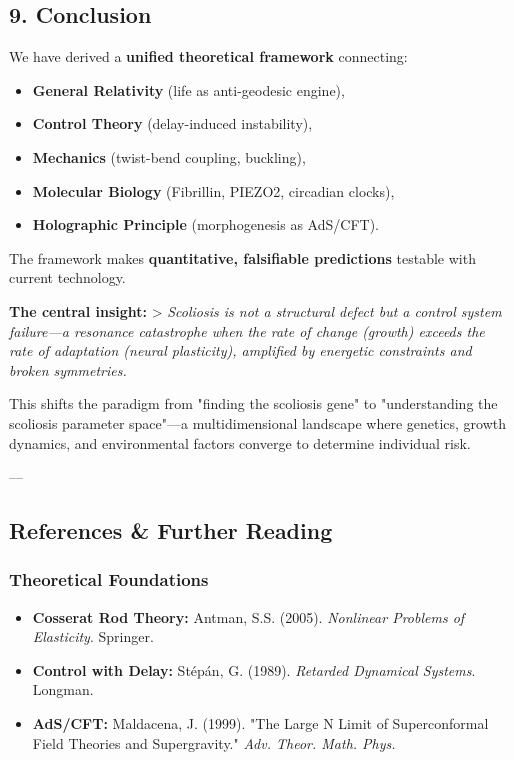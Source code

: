 \documentclass[11pt,a4paper]{article}
\begin{document}
\subsection{9. Conclusion}

We have derived a \textbf{unified theoretical framework} connecting:

\begin{itemize}
\item \textbf{General Relativity} (life as anti-geodesic engine),
\item \textbf{Control Theory} (delay-induced instability),
\item \textbf{Mechanics} (twist-bend coupling, buckling),
\item \textbf{Molecular Biology} (Fibrillin, PIEZO2, circadian clocks),
\item \textbf{Holographic Principle} (morphogenesis as AdS/CFT).
\end{itemize}

The framework makes \textbf{quantitative, falsifiable predictions} testable with current technology.

\textbf{The central insight:}
> \textit{Scoliosis is not a structural defect but a control system failure—a resonance catastrophe when the rate of change (growth) exceeds the rate of adaptation (neural plasticity), amplified by energetic constraints and broken symmetries.}

This shifts the paradigm from "finding the scoliosis gene" to "understanding the scoliosis parameter space"—a multidimensional landscape where genetics, growth dynamics, and environmental factors converge to determine individual risk.

---

\subsection{References & Further Reading}

\subsubsection{Theoretical Foundations}

\begin{itemize}
\item \textbf{Cosserat Rod Theory:} Antman, S.S. (2005). \textit{Nonlinear Problems of Elasticity}. Springer.
\item \textbf{Control with Delay:} Stépán, G. (1989). \textit{Retarded Dynamical Systems}. Longman.
\item \textbf{AdS/CFT:} Maldacena, J. (1999). "The Large N Limit of Superconformal Field Theories and Supergravity." \textit{Adv. Theor. Math. Phys.}
\end{itemize}
\end{document}
